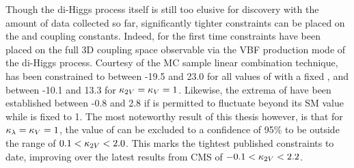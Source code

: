 Though the di-Higgs process itself is still too elusive for discovery with the amount of data collected so far,
    significantly tighter constraints can be placed on the \kvv and \kl coupling constants.
Indeed, for the first time constraints have been placed on the full
    3D coupling space observable via the VBF production mode of the di-Higgs process.
Courtesy of the MC sample linear combination technique,
    \kl has been constrained to between -19.5 and 23.0 for all values of \kvv with a fixed ,
    and between -10.1 and 13.3 for $\kappa_{2V}=\kappa_{V}=1$.
Likewise, the extrema of \kvv have been established between -0.8 and 2.8
    if \kl is permitted to fluctuate beyond its SM value while \kv is fixed to 1.
The most noteworthy result of this thesis however, is that for $\kappa_{\lambda}=\kappa_{V}=1$,
    the value of \kvv can be excluded to a confidence of 95\% to be outside the range of $0.1 < \kappa_{2V} < 2.0$.
This marks the tightest published constraints to date, improving over the latest results from CMS
    of $-0.1 < \kappa_{2V} < 2.2$\cite{cms_results}.

